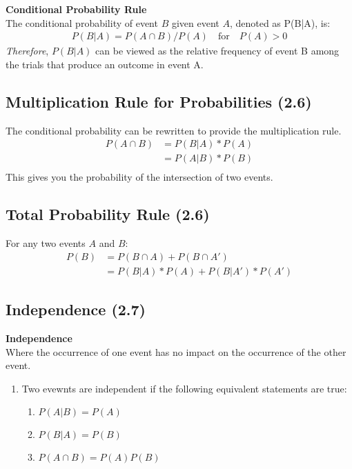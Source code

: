\documentclass[../INDE315.tex]{subfiles}
\begin{document}
\begin{defn}
    \textbf{Conditional Probability Rule} \\
    The conditional probability of event $B$ given event $A$, denoted as P(B|A), is: 
        \begin{equation*}
            \begin{aligned}
                P(B|A) = P(A \cap B) / P(A) \quad \text{for} \quad P(A) > 0 
            \end{aligned}
        \end{equation*}
    \emph{Therefore}, $P(B|A)$ can be viewed as the relative frequency of event B among the trials that produce an outcome in event A. 
\end{defn}

\subsection*{Multiplication Rule for Probabilities (2.6)}
The conditional probability can be rewritten to provide the multiplication rule.
    \begin{equation*}
        \begin{aligned}
            P(A \cap B) &= P(B|A) * P(A) \\
                    &= P(A|B) * P(B) \\
        \end{aligned}
    \end{equation*} 
This gives you the probability of the intersection of two events.

\subsection*{Total Probability Rule (2.6)}
For any two events $A$ and $B$:
    \begin{equation*}
        \begin{aligned}
            P(B) &= P(B \cap A) + P(B \cap A') \\
                &= P(B|A) * P(A) + P(B|A') * P(A')
        \end{aligned}
    \end{equation*} 

\subsection*{Independence (2.7)}
\begin{defn}
    \textbf{Independence} \\
    Where the occurrence of one event has no impact on the occurrence of the other event.
    \begin{enumerate}
        \item Two evewnts are independent if the following equivalent statements are true:
            \begin{enumerate}
                \item $P(A|B) = P(A)$
                \item $P(B|A) = P(B)$
                \item $P(A \cap B) = P(A)P(B)$
            \end{enumerate}
    \end{enumerate}
\end{defn}
\end{document}
